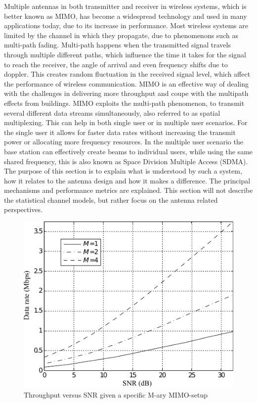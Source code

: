 \label{sec:mimo_in_handsets}
Multiple antennas in both transmitter and receiver in wireless systems, which is better known as MIMO, has become a widespread technology and used in many applications today, due to its increase in performance. Most wireless systems are limited by the channel in which they propagate, due to phenomenons such as multi-path fading. Multi-path happens when the transmitted signal travels through multiple different paths, which influence the time it takes for the signal to reach the receiver, the angle of arrival and even frequency shifts due to doppler. This creates random fluctuation in the received signal level, which affect the performance of wireless communication.  MIMO is an effective way of dealing with the challenges in delivering more throughput and coupe with the multipath effects from buildings. MIMO exploits the multi-path phenomenon, to transmit several different data streams simultaneously, also referred to as spatial multiplexing. This can help in both single user or in multiple user scenarios. For the single user it allows for faster data rates without increasing the transmit power or allocating more frequency resources. In the multiple user scenario the base station can effectively create beams to individual users, while using the same shared frequency, this is also known as Space Division Multiple Access (SDMA). The purpose of this section is to explain what is understood by such a system, how it relates to the antenna design and how it makes a difference. The principal mechanisms and performance metrics are explained. This section will not describe the statistical channel models, but rather focus on the antenna related perspectives. 

\begin{figure}[htbp]
  \centering
  \includegraphics[scale=1.2]{img/analysis/datarateMimo}
  \caption{Throughput versus SNR given a specific M-ary MIMO-setup\cite{Ezio2007MIMO}}
  \label{fig:mimo-throughput}
\end{figure}


